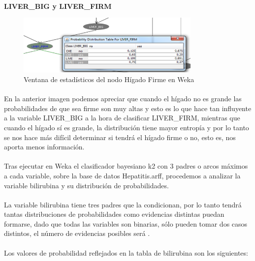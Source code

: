 \documentclass[es]{ifirak}
\begin{document}
\paragraph{}
\textbf{LIVER\_{BIG} y  LIVER\_{FIRM}}

\begin{figure}[htbp]
\centering
\includegraphics[width=0.8\textwidth]{4LiverFirm.png}
\caption{Ventana de estadísticos del nodo Hígado Firme en Weka}\label{figure}
\end{figure}

\paragraph{}
En la anterior imagen podemos apreciar que cuando el hígado no es grande las probabilidades de que sea firme son muy altas y esto es lo que hace tan influyente a la variable LIVER\_{BIG} a la hora de clasificar LIVER\_{FIRM}, mientras que cuando el hígado sí es grande, la distribución tiene mayor entropía y por lo tanto se nos hace más difícil determinar si tendrá el hígado firme o no, esto es, nos aporta menos información.
\paragraph{}
Tras ejecutar en Weka el clasificador bayesiano k2 con 3 padres o arcos máximos a cada variable, sobre la base de datos Hepatitis.arff, procedemos a analizar la variable bilirubina y su distribución de probabilidades.
\paragraph{}
La variable bilirubina tiene tres padres que la condicionan, por lo tanto tendrá tantas distribuciones de probabilidades como evidencias distintas puedan formarse, dado que todas las variables son binarias, sólo pueden tomar dos casos distintos, el número de evidencias posibles será .
\paragraph{}
Los valores de probabilidad reflejados en la tabla de bilirubina son los siguientes:
\end{document}
